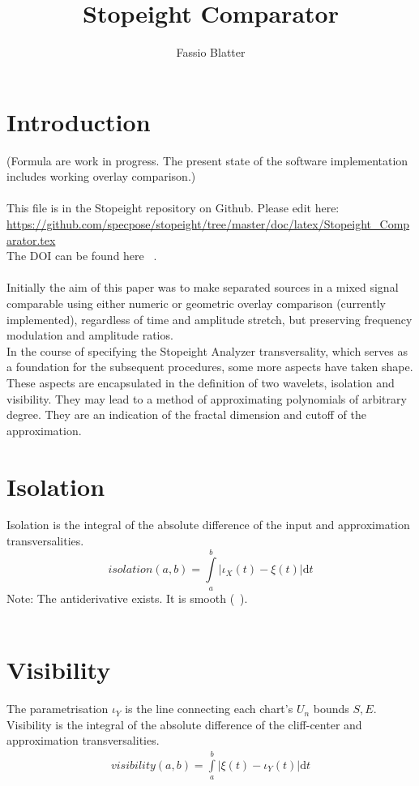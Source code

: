 \documentclass{report}
\begin{document}
\title{Stopeight Comparator}
\author{Fassio Blatter}
\maketitle

\chapter{Introduction}
(Formula are work in progress. The present state of the software implementation includes working overlay comparison.)\\\\
This file is in the Stopeight repository on Github. Please edit here:\\
\href{https://github.com/specpose/stopeight/tree/master/doc/latex/Stopeight\_Comparator.tex}{https://github.com/specpose/stopeight/tree/master/doc/latex/Stopeight\_Comparator.tex}\\
The DOI can be found here ~\cite{Stopeight}.\\\\
Initially the aim of this paper was to make separated sources in a mixed signal comparable using either numeric or geometric overlay comparison (currently implemented), regardless of time and amplitude stretch, but preserving frequency modulation and amplitude ratios.\\
In the course of specifying the Stopeight Analyzer transversality, which serves as a foundation for the subsequent procedures, some more aspects have taken shape. These aspects are encapsulated in the definition of two wavelets, isolation and visibility. They may lead to a method of approximating polynomials of arbitrary degree. They are an indication of the fractal dimension and cutoff of the approximation.

\chapter{Isolation}
Isolation is the integral of the absolute difference of the input and approximation transversalities.
\begin{equation}
isolation(a,b)=\int \limits _{a}^{b} \vert\iota_{X}(t)-\xi(t)\vert \mathrm{d}t
\end{equation}
Note: The antiderivative exists. It is smooth (~\cite[Riemann Integrable]{Widon}).\\\\

\chapter{Visibility}
The parametrisation $\iota_{Y}$ is the line connecting each chart's $U_{n}$ bounds $S,E$. Visibility is the integral of the absolute difference of the cliff-center and approximation transversalities.
\begin{align}
visibility(a,b)= \int \limits _{a}^{b} \vert \xi(t)-\iota_{Y}(t)\vert  \mathrm{d}t
\end{align}\\
\end{document}
